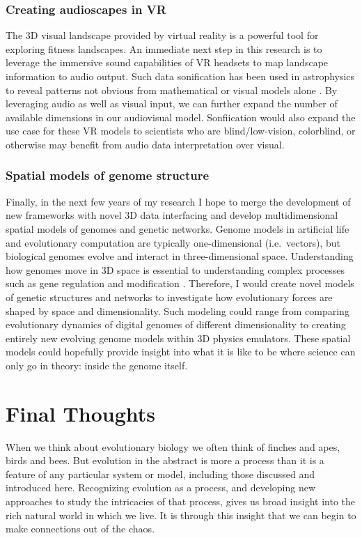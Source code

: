 \subsubsection{Creating audioscapes in VR}

The 3D visual landscape provided by virtual reality is a powerful tool for exploring fitness landscapes. 
An immediate next step in this research is to leverage the immersive sound capabilities of VR headsets to map landscape information to audio output. 
Such data sonification has been used in astrophysics to reveal patterns not obvious from mathematical or visual models alone \citep{gibney_how_2020}.
By leveraging audio as well as visual input, we can further expand the number of available dimensions in our audiovisual model.
Sonfiication would also expand the use case for these VR models to scientists who are blind/low-vision, colorblind, or otherwise may benefit from audio data interpretation over visual.

\subsubsection{Spatial models of genome structure}

Finally, in the next few years of my research I hope to merge the development of new frameworks with novel 3D data interfacing and develop multidimensional spatial models of genomes and genetic networks.
Genome models in artificial life and evolutionary computation are typically one-dimensional (i.e.~vectors), but biological genomes evolve and interact in three-dimensional space. 
Understanding how genomes move in 3D space is essential to understanding complex processes such as gene regulation and modification \citep{mendizabal_epigenetics_2014, sotelo-silveira_entering_2018}.
Therefore, I would create novel models of genetic structures and networks to investigate how evolutionary forces are shaped by space and dimensionality.
Such modeling could range from comparing evolutionary dynamics of digital genomes of different dimensionality to creating entirely new evolving genome models within 3D physics emulators. 
These spatial models could hopefully provide insight into what it is like to be where science can only go in theory: inside the genome itself.

\section{Final Thoughts}

When we think about evolutionary biology we often think of finches and apes, birds and bees. But evolution in the abstract is more a process than it is a feature of any particular system or model, including those discussed and introduced here. Recognizing evolution as a process, and developing new approaches to study the intricacies of that process, gives us broad insight into the rich natural world in which we live. It is through this insight that we can begin to make connections out of the chaos.